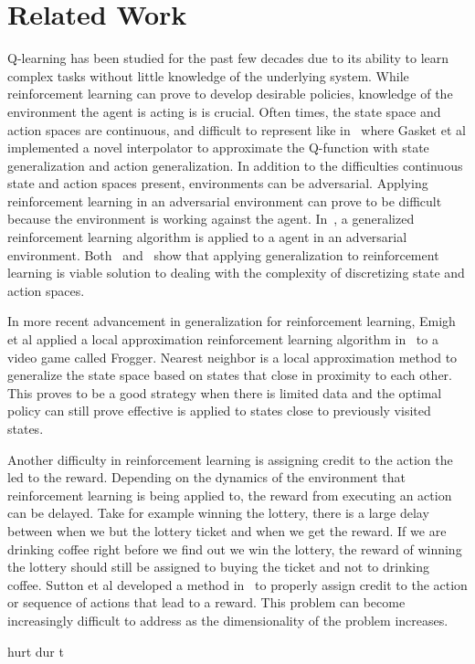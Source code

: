 \section{Related Work}

Q-learning has been studied for the past few decades due to its ability to learn complex tasks without little knowledge of the underlying system. While reinforcement learning can prove to develop desirable policies, knowledge of the environment the agent is acting is is crucial. Often times, the state space and action spaces are continuous, and difficult to represent like in~\cite{gaskett} where Gasket et al implemented a novel interpolator to approximate the Q-function with state generalization and action generalization. In addition to the difficulties continuous state and action spaces present, environments can be adversarial. Applying reinforcement learning in an adversarial environment can prove to be difficult because the environment is working against the agent. In~\cite{uther}, a generalized reinforcement learning algorithm is applied to a agent in an adversarial environment. Both~\cite{gaskett} and~\cite{uther} show that applying generalization to reinforcement learning is viable solution to dealing with the complexity of discretizing state and action spaces. 

In more recent advancement in generalization for reinforcement learning, Emigh et al applied a local approximation reinforcement learning algorithm in~\cite{emigh} to a video game called Frogger. Nearest neighbor  is a local approximation method to generalize the state space based on states that close in proximity to each other. This proves to be a good strategy when there is limited data and the optimal policy can still prove effective is applied to states close to previously visited states.

Another difficulty in reinforcement learning is assigning credit to the action the led to the reward. Depending on the dynamics of the environment that reinforcement learning is being applied to, the reward from executing an action can be delayed. Take for example winning the lottery, there is a large delay between when we but the lottery ticket and when we get the reward. If we are drinking coffee right before we find out we win the lottery, the reward of winning the lottery should still be assigned to buying the ticket and not to drinking coffee. Sutton et al developed a method in~\cite{sutton} to properly assign credit to the action or sequence of actions that lead to a reward. This problem can become increasingly difficult to address as the dimensionality of the problem increases.





hurt dur t \cite{sutton}

